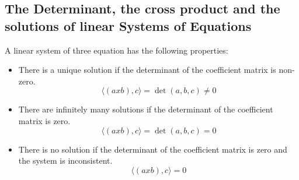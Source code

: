 \subsection{The Determinant, the cross product and the solutions of linear Systems of Equations}
A linear system of three equation has the following properties:

\begin{itemize}[label=\(-\)]
	\item There is a unique solution if the determinant of the coefficient matrix is non-zero. 
	\[\langle (a x b), c\rangle = \det(a,b,c) \ne 0\]
	\item There are infinitely many solutions if the determinant of the coefficient matrix is zero.
	\[\langle (a x b), c\rangle = \det(a,b,c) = 0\]
	\item There is no solution if the determinant of the coefficient matrix is zero and the system is inconsistent.
	\[\langle (a x b), c\rangle = 0\]
\end{itemize}

\newpage